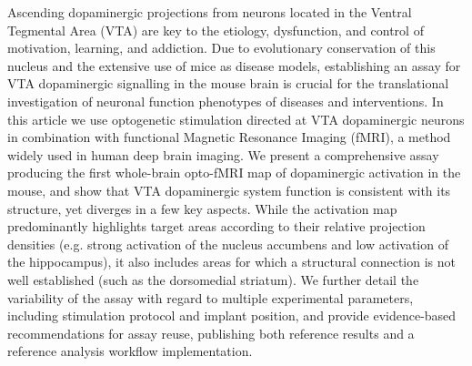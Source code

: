 Ascending dopaminergic projections from neurons located in the Ventral Tegmental Area (VTA) are key to the etiology, dysfunction, and control of motivation, learning, and addiction.
Due to evolutionary conservation of this nucleus and the extensive use of mice as disease models, establishing an assay for VTA dopaminergic signalling in the mouse brain is crucial for the translational investigation of neuronal function phenotypes of diseases and interventions.
In this article we use optogenetic stimulation directed at VTA dopaminergic neurons in combination with functional Magnetic Resonance Imaging (fMRI), a method widely used in  human deep brain imaging.
We present a comprehensive assay producing the first whole-brain opto-fMRI map of dopaminergic activation in the mouse, and show that VTA dopaminergic system function is consistent with its structure, yet diverges in a few key aspects.
While the activation map predominantly highlights target areas according to their relative projection densities (e.g. strong activation of the nucleus accumbens and low activation of the hippocampus), it also includes areas for which a structural connection is not well established (such as the dorsomedial striatum).
We further detail the variability of the assay with regard to multiple experimental parameters, including stimulation protocol and implant position, and provide evidence-based recommendations for assay reuse, publishing both reference results and a reference analysis workflow implementation.
